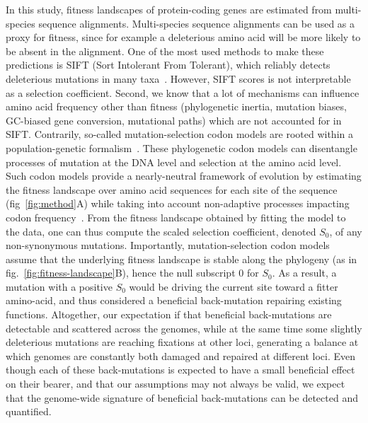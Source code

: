 \documentclass{article}
\newcommand{\Sphy}{S_{0}}
\begin{document}
    In this study, fitness landscapes of protein-coding genes are estimated from multi-species sequence alignments.
    Multi-species sequence alignments can be used as a proxy for fitness, since for example a deleterious amino acid will be more likely to be absent in the alignment.
    One of the most used methods to make these predictions is SIFT (Sort Intolerant From Tolerant), which reliably detects deleterious mutations in many taxa~\cite{ng_sift_2003, vaser_sift_2016}.
    However, SIFT scores is not interpretable as a selection coefficient.
    Second, we know that a lot of mechanisms can influence amino acid frequency other than fitness (phylogenetic inertia, mutation biases, GC-biased gene conversion, mutational paths) which are not accounted for in SIFT\@.
    Contrarily, so-called mutation-selection codon models are rooted within a population-genetic formalism~\cite{halpern_evolutionary_1998, mccandlish_modeling_2014}.
    These phylogenetic codon models can disentangle processes of mutation at the DNA level and selection at the amino acid level.
    Such codon models provide a nearly-neutral framework of evolution by estimating the fitness landscape over amino acid sequences for each site of the sequence (fig~\ref{fig:method}A) while taking into account non-adaptive processes impacting codon frequency~\cite{halpern_evolutionary_1998, rodrigue_mechanistic_2010, tamuri_estimating_2012, latrille_improved_2022a}.
    From the fitness landscape obtained by fitting the model to the data, one can thus compute the scaled selection coefficient, denoted $\Sphy$, of any non-synonymous mutations.
    Importantly, mutation-selection codon models assume that the underlying fitness landscape is stable along the phylogeny (as in fig.~\ref{fig:fitness-landscape}B), hence the null subscript $0$ for $\Sphy$.
    As a result, a mutation with a positive $\Sphy$ would be driving the current site toward a fitter amino-acid, and thus considered a beneficial back-mutation repairing existing functions.
    Altogether, our expectation if that beneficial back-mutations are detectable and scattered across the genomes, while at the same time some slightly deleterious mutations are reaching fixations at other loci, generating a balance at which genomes are constantly both damaged and repaired at different loci.
    Even though each of these back-mutations is expected to have a small beneficial effect on their bearer, and that our assumptions may not always be valid, we expect that the genome-wide signature of beneficial back-mutations can be detected and quantified.
\end{document}
